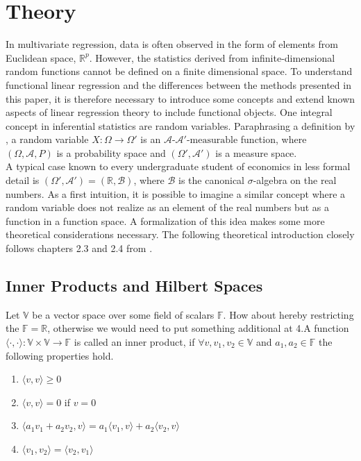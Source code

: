 \documentclass[11pt,twoside,a4paper]{article}
\begin{document}
	\section{Theory}
	In multivariate regression, data is often observed in the form of elements from Euclidean space, $\mathbb{R}^p$. However, the statistics derived from infinite-dimensional random functions cannot be defined on a finite dimensional space. To understand functional linear regression and the differences between the methods presented in this paper, it is therefore necessary to introduce some concepts and extend known aspects of linear regression theory to include functional objects. One integral concept in inferential statistics are random variables. Paraphrasing a definition by \cite{bauer_wahrscheinlichkeitstheorie_2020}, a random variable $X:\Omega \rightarrow \Omega'$ is an $\mathcal{A} \text{-} \mathcal{A'} \text{-measurable}$ function, where $(\Omega, \mathcal{A}, P)$ is a probability space and $(\Omega', \mathcal{A'})$ is a measure space.\\
	A typical case known to every undergraduate student of economics in less formal detail is $(\Omega', \mathcal{A'}) = (\mathbb{R}, \mathcal{B})$, where $\mathcal{B}$ is the canonical $\sigma$-algebra on the real numbers. As a first intuition, it is possible to imagine a similar concept where a random variable does not realize as an element of the real numbers but as a function in a function space. A formalization of this idea makes some more theoretical considerations necessary. The following theoretical introduction closely follows chapters 2.3 and 2.4 from \cite{hsing_theoretical_2015}. 
	
	\subsection{Inner Products and Hilbert Spaces}
	Let $\mathbb{V}$ be a vector space over some field of scalars $\mathbb{F}$. {\color{orange} How about hereby restricting the $\mathbb{F} = \mathbb{R}$, otherwise we would need to put something additional at 4.}A function $\langle \cdot, \cdot \rangle : \mathbb{V} \times  \mathbb{V} \rightarrow \mathbb{F}$ is called an inner product, if $\forall v, v_1, v_2 \in \mathbb{V}$ and $a_1, a_2 \in \mathbb{F}$ the following properties hold.
	
	\begin{multicols}{2}
		\begin{enumerate}
			\item $\langle v, v \rangle \geq 0$
			\item $\langle v, v \rangle = 0$ if $v = 0$
			\item $\langle a_1 v_1 + a_2 v_2, v \rangle = a_1 \langle v_1, v \rangle + a_2 \langle v_2, v \rangle$
			\item $\langle v_1, v_2 \rangle = \langle v_2, v_1 \rangle$
		\end{enumerate}
	\end{multicols}
\end{document}

